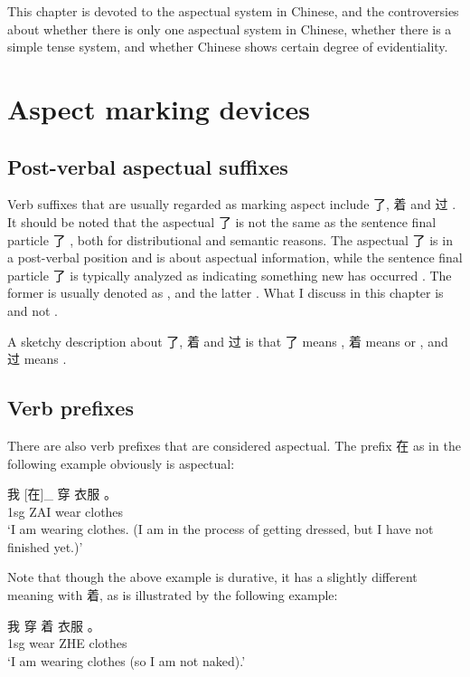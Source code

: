 This chapter is devoted to the aspectual system in Chinese, 
and the controversies about whether there is only one aspectual system in Chinese, 
whether there is a simple tense system, and whether Chinese shows certain degree of evidentiality.

\section{Aspect marking devices}\label{sec:aspect-marking-device}

\subsection{Post-verbal aspectual suffixes}\label{sec:post-verbal-aspect}

Verb suffixes that are usually regarded as marking aspect include 了, 着 and 过 . 
It should be noted that the aspectual 了 is not the same as the sentence final particle 了 , 
both for distributional and semantic reasons.
The aspectual 了 is in a post-verbal position and is about aspectual information, 
while the sentence final particle 了 is typically analyzed as indicating something new has occurred 
\citep[]{zhudexigrammar}.
The former is usually denoted as , and the latter  \citep{peng2005le12}. 
What I discuss in this chapter is  and not . 

A sketchy description about 了, 着 and 过 is that 
了 means , 着 means  or , 
and 过 means  
\cite[]{li1989mandarin}.

\subsection{Verb prefixes}\label{sec:pre-verbal-aspect}

There are also verb prefixes that are considered aspectual. 
The prefix 在 as in the following example obviously is aspectual:
\begin{exe}
    \ex \gll 我 [在]_{} 穿 衣服 。\\
    1sg ZAI wear clothes \\
    \glt `I am wearing clothes. (I am in the process of getting dressed, but I have not finished yet.)'
\end{exe} 
Note that though the above example is durative, it has a slightly different meaning with 着, 
as is illustrated by the following example: 
\begin{exe}
    \ex \gll 我 穿 着 衣服 。 \\
    1sg wear ZHE clothes \\
    \glt `I am wearing clothes (so I am not naked).'
\end{exe}

